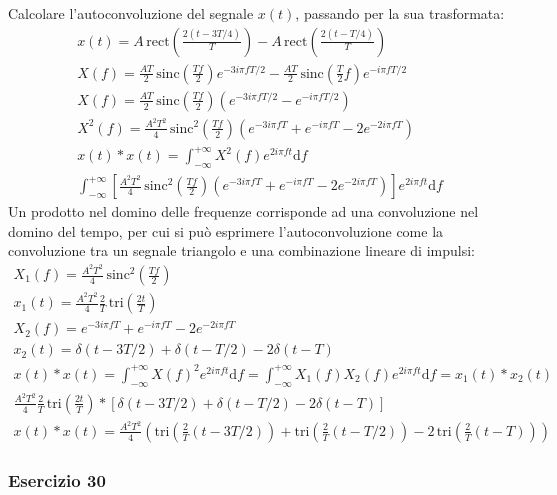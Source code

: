 \documentclass{article}
\newcommand{\rect}{\mathrm{rect}}
\newcommand{\sinc}{\mathrm{sinc}}
\newcommand{\tri}{\mathrm{tri}}
\newcommand{\df}{\mathrm{d}}
\begin{document}
Calcolare l'autoconvoluzione del segnale $x(t)$, passando per la sua trasformata: 
\begin{gather*}
    x(t)=A\,\rect\displaystyle\left(\frac{2(t-3T/4)}{T}\right)-A\,\rect\displaystyle\left(\frac{2(t-T/4)}{T}\right)\\
    X(f)=\displaystyle\frac{AT}{2}\,\sinc\left(\frac{Tf}{2}\right)e^{-3i\pi fT/2}-\displaystyle\frac{AT}{2}\,\sinc\left(\frac{T}{2}f\right)e^{-i\pi fT/2}\\
    X(f)=\displaystyle\frac{AT}{2}\,\sinc\left(\frac{Tf}{2}\right)\left(e^{-3i\pi fT/2}-e^{-i\pi fT/2}\right)\\
    X^2(f)=\displaystyle\frac{A^2T^2}{4}\,\sinc^2\left(\frac{Tf}{2}\right)\left(e^{-3i\pi fT}+e^{-i\pi fT}-2e^{-2i\pi fT}\right)\\
    x(t)*x(t)=\displaystyle\int_{-\infty}^{+\infty}X^2(f)e^{2i\pi ft}\df f\\
    \displaystyle\int_{-\infty}^{+\infty}\left[\frac{A^2T^2}{4}\,\sinc^2\left(\frac{Tf}{2}\right)\left(e^{-3i\pi fT}+e^{-i\pi fT}-2e^{-2i\pi fT}\right)\right]e^{2i\pi ft}\df f
\end{gather*}
Un prodotto nel domino delle frequenze corrisponde ad una convoluzione nel domino del tempo, per cui si può esprimere l'autoconvoluzione come la convoluzione tra un segnale 
triangolo e una combinazione lineare di impulsi:
\begin{gather*}
    X_1(f)=\displaystyle\frac{A^2T^2}{4}\,\sinc^2\left(\frac{Tf}{2}\right)\\
    x_1(t)=\displaystyle\frac{A^2T^2}{4}\frac{2}{T}\,\tri \left(\frac{2t}{T}\right)\\
    X_2(f)=e^{-3i\pi fT}+e^{-i\pi fT}-2e^{-2i\pi fT}\\
    x_2(t)=\delta(t-3T/2)+\delta(t-T/2)-2\delta(t-T)\\
    x(t)*x(t)=\displaystyle\int_{-\infty}^{+\infty}X(f)^2e^{2i\pi ft}\df f=\int_{-\infty}^{+\infty}X_1(f)X_2(f)e^{2i\pi ft}\df f=x_1(t)*x_2(t)\\
    \displaystyle\frac{A^2T^2}{4}\frac{2}{T}\,\tri \left(\frac{2t}{T}\right)*\left[\delta(t-3T/2)+\delta(t-T/2)-2\delta(t-T)\right]
\end{gather*}
\begin{gather}
    x(t)*x(t)=\displaystyle\frac{A^2T^2}{4}\left(\tri \left(\frac{2}{T}(t-3T/2)\right)+\tri \left(\frac{2}{T}(t-T/2)\right)-2\,\tri \left(\frac{2}{T}(t-T)\right)\right)
\end{gather}

\subsubsection*{Esercizio 30}
\end{document}

